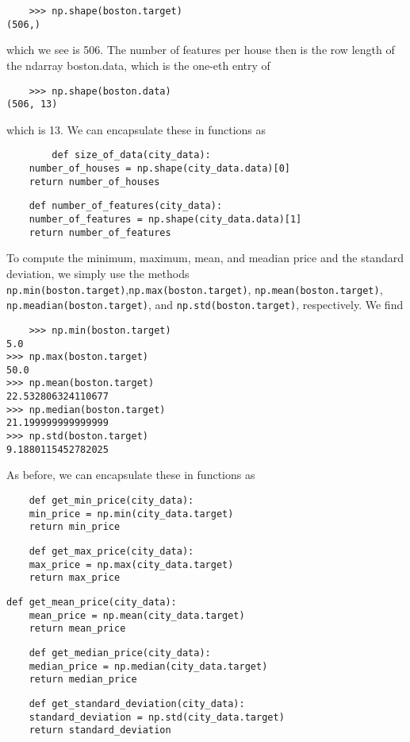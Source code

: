 \documentclass[12 pt]{article}
\numberwithin{equation}{section}
\begin{document}
\begin{verbatim}
	>>> np.shape(boston.target)
(506,)
\end{verbatim}
which we see is 506. The number of features per house then is the row length of the ndarray boston.data, which is the one-eth entry of
\begin{verbatim}
	>>> np.shape(boston.data)
(506, 13)
\end{verbatim}
which is 13. We can encapsulate these in functions as 
\begin{verbatim}
		def size_of_data(city_data):
    number_of_houses = np.shape(city_data.data)[0]
    return number_of_houses
\end{verbatim}
\begin{verbatim}
	def number_of_features(city_data):
    number_of_features = np.shape(city_data.data)[1]
    return number_of_features
\end{verbatim}

To compute the minimum, maximum, mean, and meadian price and the standard deviation, we simply use the methods \texttt{np.min(boston.target)},\texttt{np.max(boston.target)}, \texttt{np.mean(boston.target)}, \texttt{np.meadian(boston.target)}, and \texttt{np.std(boston.target)}, respectively. We find
\begin{verbatim}
	>>> np.min(boston.target)
5.0
>>> np.max(boston.target)
50.0
>>> np.mean(boston.target)
22.532806324110677
>>> np.median(boston.target)
21.199999999999999
>>> np.std(boston.target)
9.1880115452782025
\end{verbatim}
As before, we can encapsulate these in functions as
\begin{verbatim}
	def get_min_price(city_data):
    min_price = np.min(city_data.target)
    return min_price
\end{verbatim}
\begin{verbatim}
	def get_max_price(city_data):
    max_price = np.max(city_data.target)
    return max_price
\end{verbatim}
\begin{verbatim}
def get_mean_price(city_data):
    mean_price = np.mean(city_data.target)
    return mean_price
\end{verbatim}
\begin{verbatim}
	def get_median_price(city_data):
    median_price = np.median(city_data.target)
    return median_price
\end{verbatim}
\begin{verbatim}
	def get_standard_deviation(city_data):
    standard_deviation = np.std(city_data.target)
    return standard_deviation
\end{verbatim}
\end{document}
